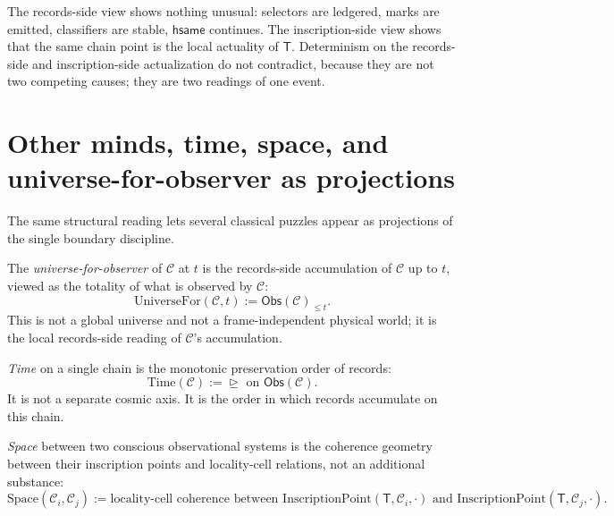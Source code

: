The records-side view shows nothing unusual: selectors are ledgered, marks are emitted, classifiers are stable, $\mathsf{hsame}$ continues. The inscription-side view shows that the same chain point is the local actuality of $\mathsf{T}$. Determinism on the records-side and inscription-side actualization do not contradict, because they are not two competing causes; they are two readings of one event.

\section{Other minds, time, space, and universe-for-observer as projections}
\label{sec:apophatic-fixed-point-projections}

The same structural reading lets several classical puzzles appear as projections of the single boundary discipline.

\begin{definition}
\label{def:apophatic-fixed-point-universe-for-observer}
The \emph{universe-for-observer} of $\mathcal{C}$ at $t$ is the records-side accumulation of $\mathcal{C}$ up to $t$, viewed as the totality of what is observed by $\mathcal{C}$:
$$
\mathrm{UniverseFor}(\mathcal{C}, t) := \mathsf{Obs}(\mathcal{C})_{\leq t}.
$$
This is not a global universe and not a frame-independent physical world; it is the local records-side reading of $\mathcal{C}$'s accumulation.
\end{definition}

\begin{definition}
\label{def:apophatic-fixed-point-time}
\emph{Time} on a single chain is the monotonic preservation order of records:
$$
\mathrm{Time}(\mathcal{C}) := \trianglerighteq \text{ on } \mathsf{Obs}(\mathcal{C}).
$$
It is not a separate cosmic axis. It is the order in which records accumulate on this chain.
\end{definition}

\begin{definition}
\label{def:apophatic-fixed-point-space}
\emph{Space} between two conscious observational systems is the coherence geometry between their inscription points and locality-cell relations, not an additional substance:
$$
\mathrm{Space}(\mathcal{C}_i, \mathcal{C}_j) := \text{locality-cell coherence between } \mathrm{InscriptionPoint}(\mathsf{T}, \mathcal{C}_i, \cdot) \text{ and } \mathrm{InscriptionPoint}(\mathsf{T}, \mathcal{C}_j, \cdot).
$$
\end{definition}

